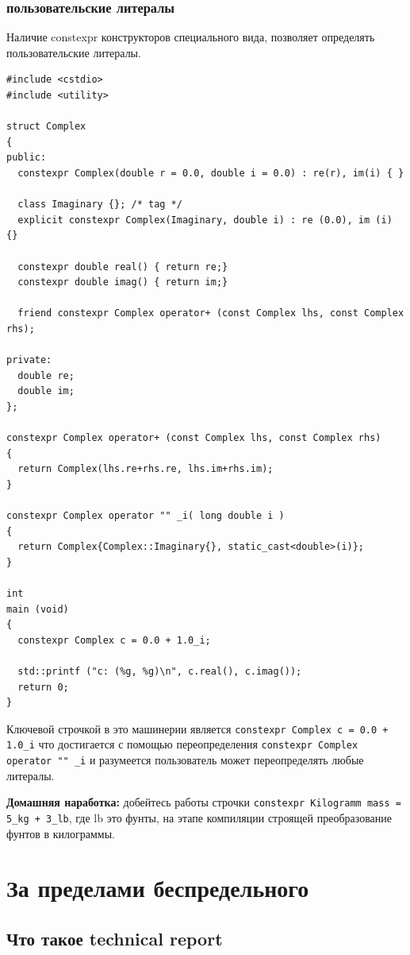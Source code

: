 \documentclass[a4paper,12pt,oneside]{article}
\begin{document}
\subsubsection{пользовательские литералы}

Наличие constexpr конструкторов специального вида, позволяет определять пользовательские литералы.

\begin{lstlisting}
#include <cstdio>
#include <utility>

struct Complex
{
public:
  constexpr Complex(double r = 0.0, double i = 0.0) : re(r), im(i) { }

  class Imaginary {}; /* tag */
  explicit constexpr Complex(Imaginary, double i) : re (0.0), im (i) {}

  constexpr double real() { return re;}
  constexpr double imag() { return im;}

  friend constexpr Complex operator+ (const Complex lhs, const Complex rhs);

private:
  double re;
  double im;
};

constexpr Complex operator+ (const Complex lhs, const Complex rhs)
{
  return Complex(lhs.re+rhs.re, lhs.im+rhs.im);
}

constexpr Complex operator "" _i( long double i )
{
  return Complex{Complex::Imaginary{}, static_cast<double>(i)};
}

int
main (void)
{
  constexpr Complex c = 0.0 + 1.0_i;

  std::printf ("c: (%g, %g)\n", c.real(), c.imag());
  return 0;
}
\end{lstlisting}

Ключевой строчкой в это машинерии является \lstinline!constexpr Complex c = 0.0 + 1.0_i! что достигается с помощью переопределения \lstinline!constexpr Complex operator "" _i! и разумеется пользователь может переопределять любые литералы.

\textbf{Домашняя наработка:} добейтесь работы строчки \lstinline!constexpr Kilogramm mass = 5_kg + 3_lb!, где lb это фунты, на этапе компиляции строящей преобразование фунтов в килограммы.

\pagebreak
\section{За пределами беспредельного}

\subsection{Что такое technical report}
\end{document}
